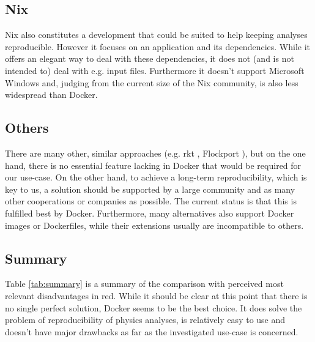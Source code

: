 \documentclass[a4paper, twoside, 11pt]{article}
\begin{document}
\subsection{Nix}
Nix \cite{nix:about} also constitutes a development that could be suited to help keeping analyses reproducible. 
However it focuses on an application and its dependencies. 
While it offers an elegant way to deal with these dependencies, it does not (and is not intended to) deal with e.g. input files. 
Furthermore it doesn't support Microsoft Windows and, 
judging from the current size of the Nix community, is also less widespread than Docker. 


\subsection{Others}
There are many other, similar approaches 
(e.g. rkt \cite{rkt:about}, Flockport \cite{flockport:about}), 
but on the one hand, there is no essential feature lacking in Docker that would be required 
for our use-case. 
On the other hand, to achieve a long-term reproducibility, which is key to us, 
a solution should be supported by a large community and as many other cooperations or companies as possible. 
The current status is that this is fulfilled best by Docker. 
Furthermore, many alternatives also support Docker images or Dockerfiles, while their extensions usually are incompatible to others. 


\subsection{Summary}

Table \ref{tab:summary} is a summary of the comparison with perceived most relevant disadvantages in red.  
While it should be clear at this point that there is no single perfect solution, 
Docker seems to be the best choice. It does solve the problem of reproducibility of physics analyses, 
is relatively easy to use \cite{km3net:howdocker} 
and doesn't have major drawbacks as far as the investigated use-case is concerned. 
\end{document}
